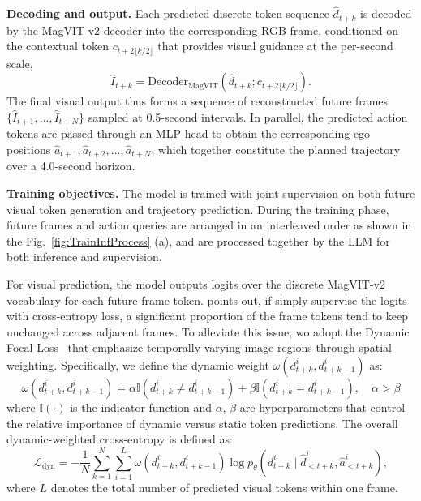 \documentclass[runningheads]{llncs}
\begin{document}
\noindent\textbf{Decoding and output.}
Each predicted discrete token sequence $\hat d_{t+k}$ is decoded by the MagVIT-v2 decoder into the corresponding RGB frame, conditioned on the contextual token $c_{t+2\lfloor k/2 \rfloor}$ that provides visual guidance at the per-second scale,
\begin{equation}
\hat I_{t+k} = \mathrm{Decoder}_{\mathrm{MagVIT}}(\hat d_{t+k}; c_{t+2\lfloor k/2 \rfloor}).
\end{equation}
The final visual output thus forms a sequence of reconstructed future frames 
\(\{\hat I_{t+1}, \dots, \hat I_{t+N}\}\) sampled at 0.5-second intervals. 
In parallel, the predicted action tokens are passed through an MLP head to obtain the corresponding ego positions 
\(\hat a_{t+1}, \hat a_{t+2}, \dots, \hat a_{t+N}\), 
which together constitute the planned trajectory over a 4.0-second horizon.

\noindent\textbf{Training objectives.}
The model is trained with joint supervision on both future visual token generation and trajectory prediction. During the training phase, future frames and action queries are arranged in an interleaved order as shown in the Fig.~\ref{fig:TrainInfProcess} (a), and are processed together by the LLM for both inference and supervision.

For visual prediction, the model outputs logits over the discrete MagVIT-v2~\cite{yu2024magvitv2} vocabulary for each future frame token. \cite{zhao2025pwm} points out, if simply supervise the logits with cross-entropy loss, a significant proportion of the frame tokens tend to keep unchanged across adjacent frames. To alleviate this issue, wo adopt the Dynamic Focal Loss~\cite{zhao2025pwm} that emphasize temporally varying image regions through spatial weighting. Specifically, we define the dynamic weight \(\omega(d_{t+k}^i, d_{t+k-1}^i)\) as:
\begin{equation}
\omega(d_{t+k}^i, d_{t+k-1}^i)=\alpha \mathbb{I}(d_{t+k}^i\ne d_{t+k-1}^i)+\beta \mathbb{I}(d_{t+k}^i=d_{t+k-1}^i), \quad \alpha > \beta
\end{equation}
where \(\mathbb{I}(\cdot)\) is the indicator function and \(\alpha\), \(\beta\) are hyperparameters that control the relative importance of dynamic versus static token predictions. The overall dynamic-weighted cross-entropy is defined as:
\begin{equation}
\mathcal{L}_{\text{dyn}} 
= -\frac{1}{N}\sum_{k=1}^{N}\sum_{i=1}^{L} 
\omega(d_{t+k}^i, d_{t+k-1}^i)\log p_\theta(d_{t+k}^i \mid \hat d_{<t+k}^i, \hat a_{<t+k}^i),
\end{equation}
where \(L\) denotes the total number of predicted visual tokens within one frame.
\end{document}
